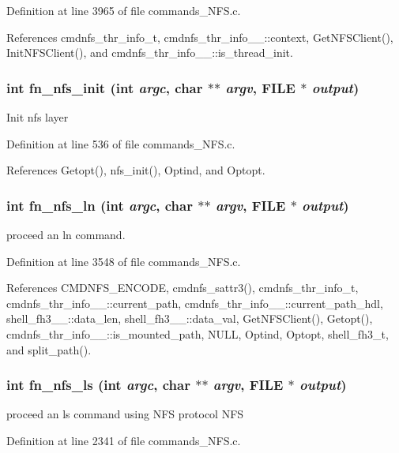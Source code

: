 Definition at line 3965 of file commands\_\-NFS.c.

References cmdnfs\_\-thr\_\-info\_\-t, cmdnfs\_\-thr\_\-info\_\-\_\-::context, Get\-NFSClient(), Init\-NFSClient(), and cmdnfs\_\-thr\_\-info\_\-\_\-::is\_\-thread\_\-init.
\subsubsection{\setlength{\rightskip}{0pt plus 5cm}int fn\_\-nfs\_\-init (int {\em argc}, char $\ast$$\ast$ {\em argv}, FILE $\ast$ {\em output})}\label{commands_8h_a60}


Init nfs layer 

Definition at line 536 of file commands\_\-NFS.c.

References Getopt(), nfs\_\-init(), Optind, and Optopt.
\subsubsection{\setlength{\rightskip}{0pt plus 5cm}int fn\_\-nfs\_\-ln (int {\em argc}, char $\ast$$\ast$ {\em argv}, FILE $\ast$ {\em output})}\label{commands_8h_a76}


proceed an ln command. 

Definition at line 3548 of file commands\_\-NFS.c.

References CMDNFS\_\-ENCODE, cmdnfs\_\-sattr3(), cmdnfs\_\-thr\_\-info\_\-t, cmdnfs\_\-thr\_\-info\_\-\_\-::current\_\-path, cmdnfs\_\-thr\_\-info\_\-\_\-::current\_\-path\_\-hdl, shell\_\-fh3\_\-\_\-::data\_\-len, shell\_\-fh3\_\-\_\-::data\_\-val, Get\-NFSClient(), Getopt(), cmdnfs\_\-thr\_\-info\_\-\_\-::is\_\-mounted\_\-path, NULL, Optind, Optopt, shell\_\-fh3\_\-t, and split\_\-path().
\subsubsection{\setlength{\rightskip}{0pt plus 5cm}int fn\_\-nfs\_\-ls (int {\em argc}, char $\ast$$\ast$ {\em argv}, FILE $\ast$ {\em output})}\label{commands_8h_a66}


proceed an ls command using NFS protocol NFS 

Definition at line 2341 of file commands\_\-NFS.c.

